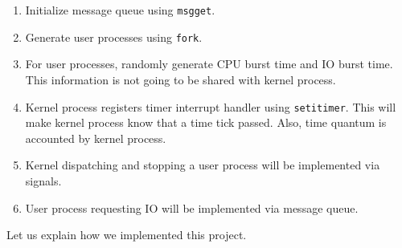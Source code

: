 \documentclass{homework}
\begin{document}
\begin{enumerate}
    \item Initialize message queue using \texttt{msgget}.
    \item Generate user processes using \texttt{fork}.
    \item For user processes, randomly generate CPU burst time and IO burst time. This information is not going to be shared with kernel process.
    \item Kernel process registers timer interrupt handler using \texttt{setitimer}. This will make kernel process know that a time tick passed. Also, time quantum is accounted by kernel process.
    \item Kernel dispatching and stopping a user process will be implemented via signals.
    \item User process requesting IO will be implemented via message queue.
\end{enumerate}
Let us explain how we implemented this project.
\pagebreak
\end{document}
